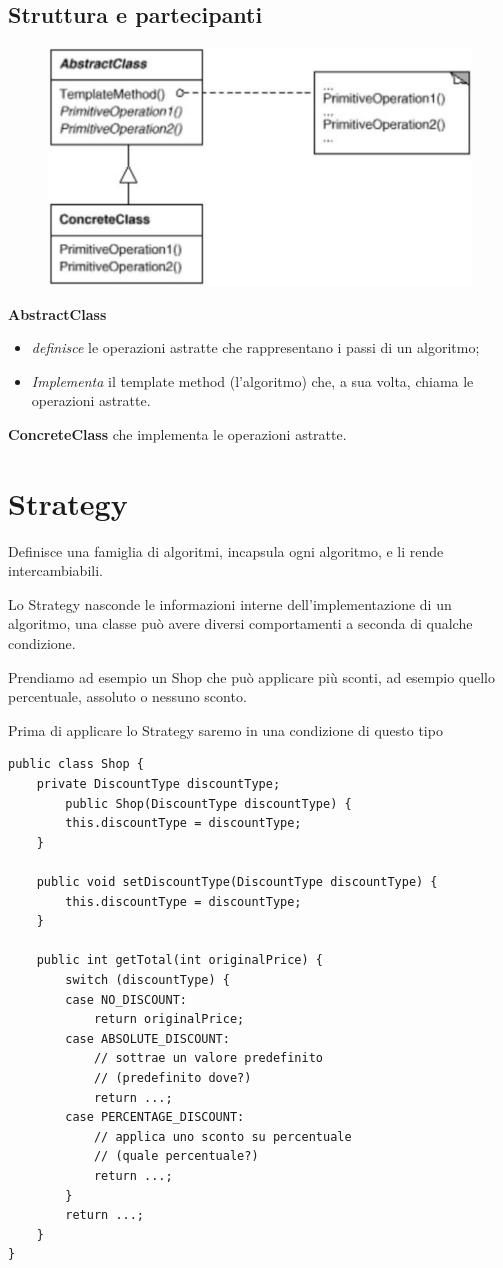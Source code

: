 \subsection{Struttura e partecipanti}

\begin{figure}[H]
    \centering
    \includegraphics[width=0.4\linewidth]{../../immagini/templateMethod_Strategy/struttura_templateMethod}    
\end{figure}

\textbf{AbstractClass} 

\begin{itemize}
    \item \textit{definisce} le operazioni astratte che rappresentano i passi di un algoritmo;
    \item \textit{Implementa} il template method (l’algoritmo) che, a sua volta, chiama le operazioni astratte.
\end{itemize}

\textbf{ConcreteClass} che implementa le operazioni astratte.

\section{Strategy}

Definisce una famiglia di algoritmi, incapsula ogni algoritmo, e li rende intercambiabili.

Lo Strategy nasconde le informazioni interne dell’implementazione di un algoritmo, una classe può avere diversi comportamenti a seconda di qualche condizione.

Prendiamo ad esempio un Shop che può applicare più sconti, ad esempio quello percentuale, assoluto o nessuno sconto.

Prima di applicare lo Strategy saremo in una condizione di questo tipo
\begin{lstlisting}
public class Shop {
    private DiscountType discountType;
        public Shop(DiscountType discountType) {
        this.discountType = discountType;
    }

    public void setDiscountType(DiscountType discountType) {
        this.discountType = discountType;
    }

    public int getTotal(int originalPrice) {
        switch (discountType) {
        case NO_DISCOUNT:
            return originalPrice;
        case ABSOLUTE_DISCOUNT:
            // sottrae un valore predefinito
            // (predefinito dove?)
            return ...;
        case PERCENTAGE_DISCOUNT:
            // applica uno sconto su percentuale
            // (quale percentuale?)
            return ...;
        }
        return ...;
    }
}
\end{lstlisting}

